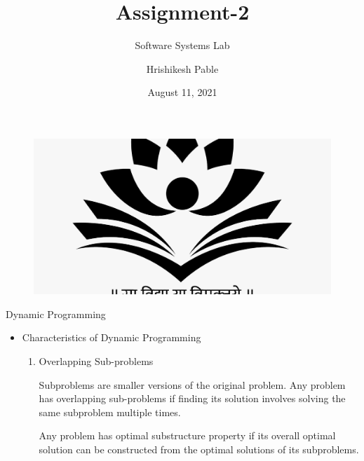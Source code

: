 \documentclass{beamer}[10pt]
\title{\textrm{Assignment-2}}
\subtitle{\textrm{Software Systems Lab}}
\author{\textrm{Hrishikesh Pable }}
\institute{IIT Dharwad \\
\href{https://www.iitdh.ac.in/}{\texttt{https://www.iitdh.ac.in/}}}
\date{August 11, 2021}
\begin{document}
\begin{titlepage}



\begin{figure}[H]
    \centering
    \includegraphics[scale=0.10]{Image 2.jpeg}
    \label{fig:fig1}
\end{figure}

\end{titlepage}

    

\begin{frame}{Dynamic Programming}
\begin{itemize}
    \item Characteristics of Dynamic Programming
    \begin{enumerate}
        \item Overlapping Sub-problems
        \begin{block}{1}
            Subproblems are smaller versions of the original problem. Any problem has overlapping sub-problems if finding its solution involves solving the same subproblem multiple times.
        \end{block}
        \begin{block}{2}
            Any problem has optimal substructure property if its overall optimal solution can be constructed from the optimal solutions of its subproblems.
        \end{block}
    \end{enumerate}
\end{itemize}
    
\end{frame}
\end{document}
